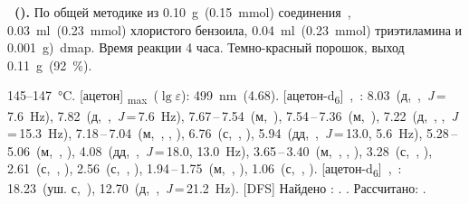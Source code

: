 \textbf{~().} 
По общей методике из \SI{0.10}{\gram}~(\SI{0.15}{\milli\mole}) соединения~, \SI{0.03}{\milli\litre}~(\SI{0.23}{\milli\mole}) хлористого бензоила, \SI{0.04}{\milli\litre}~(\SI{0.23}{\milli\mole}) триэтиламина и \SI{0.001}{\gram})~\ac{dmap}.
Время реакции 4 часа.
Темно-красный порошок, выход \SI{0.11}{\gram}~(\SI{92}{\percent}).
\begin{experimental}
     145--\SI{147}{\celsius}.
    [ацетон] \chemlambda\textsubscript{max}~($\lg \varepsilon$): \SI{499}{\nano\metre}~(4.68).
    [ацетон-d\textsubscript{6}]~\chemdelta,~\si{\ppm}: 8.03~(д,~,~\textit{J}\,=\,7.6~\si{\hertz}), 7.82~(д,~,~\textit{J}\,=\,7.6~\si{\hertz}), 7.67\,--\,7.54~(м,~), 7.54\,--\,7.36~(м,~), 7.22~(д,~, ,~\textit{J}\,=\,15.3~\si{\hertz}), 7.18\,--\,7.04~(м,~, , ), 6.76~(с,~, ), 5.94~(дд,~,~\textit{J}\,=\,13.0, 5.6~\si{\hertz}), 5.28\,--\,5.06~(м,~, ), 4.08~(дд,~,~\textit{J}\,=\,18.0, 13.0~\si{\hertz}), 3.65\,--\,3.40~(м,~, , ), 3.28~(с,~, ), 2.61~(с,~, ), 2.56~(с,~, ), 1.94\,--\,1.75~(м,~, ), 1.06~(с,~, ).
    [ацетон-d\textsubscript{6}]~\chemdelta,~\si{\ppm}: 18.23~(уш. с,~), 12.70~(д,~,~\textit{J}\,=\,21.2~\si{\hertz}).
    [DFS] Найдено \ce{[M+]}: \num{}. . Рассчитано:  \num{}. 
\end{experimental}

